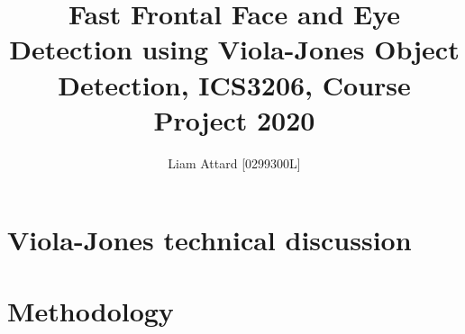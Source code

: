 \documentclass[12pt,conference]{IEEEtran}
\title{Fast Frontal Face and Eye Detection using Viola-Jones Object	Detection, ICS3206, Course Project 2020}
\author{Liam Attard [0299300L]}
\date{}
\begin{document}
    \maketitle

    \section{Viola-Jones technical discussion}

        

    \section{Methodology}
        

            
             
\end{document}
